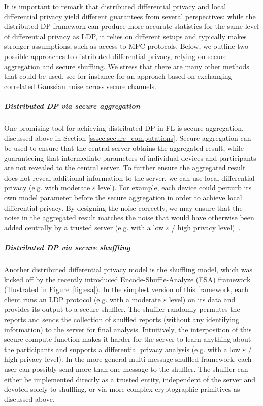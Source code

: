 It is important to remark that distributed differential privacy and local differential privacy yield different guarantees from several perspectives: while the distributed DP framework can produce more accurate statistics for the same level of differential privacy as LDP, it relies on different setups and typically makes stronger assumptions, such as access to MPC protocols. Below, we outline two possible approaches to distributed differential privacy, relying on secure aggregation and secure shuffling. We stress that there are many other methods that could be used, see for instance \cite{sabater2020} for an approach based on exchanging correlated Gaussian noise across secure channels.

\subparagraph{Distributed DP via secure aggregation} One promising tool for achieving distributed DP in FL is secure aggregation, discussed above in Section \ref{sssec:secure_computations}. Secure aggregation can be used to ensure that the central server obtains the aggregated result, while guaranteeing that intermediate parameters of individual devices and participants are not revealed to the central server. To further ensure the aggregated result does not reveal additional information to the server, we can use local differential privacy (e.g. with moderate $\varepsilon$ level). For example, each device could perturb its own model parameter before the secure aggregation in order to achieve local differential privacy. By designing the noise correctly, we may ensure that the noise in the aggregated result matches the noise that would have otherwise been added centrally by a trusted server (e.g. with a low $\varepsilon$ / high privacy level)~\cite{Acs:2011:IDD:2042445.2042457, Rastogi:2010:DPA:1807167.1807247, Ghosh:2009:UUP:1536414.1536464, shi2011privacy, DBLP:journals/tdsc/GoryczkaX17}. 

\subparagraph{Distributed DP via secure shuffling} Another distributed differential privacy model is the shuffling model, which was kicked off by the recently introduced Encode-Shuffle-Analyze (ESA) framework~\cite{prochlo} (illustrated in Figure~\ref{fig:esa}). In the simplest version of this framework, each client runs an LDP protocol (e.g. with a moderate $\varepsilon$ level) on its data and provides its output to a secure shuffler. The shuffler randomly permutes the reports and sends the collection of shuffled reports (without any identifying information) to the server for final analysis. Intuitively, the interposition of this secure compute function makes it harder for the server to learn anything about the participants and supports a differential privacy analysis (e.g. with a low $\varepsilon$ / high privacy level). In the more general multi-message shuffled framework, each user can possibly send more than one message to the shuffler. The shuffler can either be implemented directly as a trusted entity, independent of the server and devoted solely to shuffling, or via more complex cryptographic primitives as discussed above.

